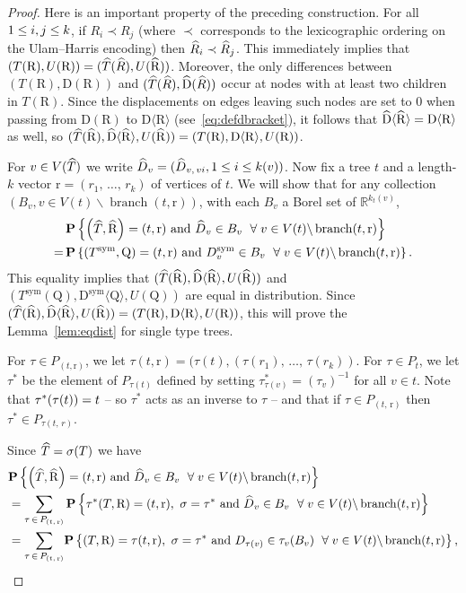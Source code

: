 \documentclass[AHL,Unicode,longabstracts,published]{cedram}
\providecommand{\R}{}
\renewcommand{\R}{\mathbb{R}}
\newcommand{\rD}{\mathrm{D}}
\newcommand{\rQ}{\mathrm{Q}}
\newcommand{\rR}{\mathrm{R}}
\newcommand{\rr}{\mathrm{r}}
\DeclareMathOperator{\sym}{sym}
\DeclareMathOperator{\branch}{branch }
\newcommand{\p}[1]{\mathbf{P}\left\{#1\right\}}
\newcommand{\Permvecs}{P}
\newcommand{\angles}[1]{\langle #1 \rangle}
\let\oldhat\hat
\renewcommand*{\hat}[1]{\mathchoice{\widehat{#1}}{\widehat{#1}}{\oldhat{#1}}{\oldhat{#1}}}
\let\oldforall\forall
\renewcommand*{\forall}{\mathrel{\oldforall}}
\newcommand{\R}{\mathbb{R}}
\begin{document}
\begin{proof}
Here is an important property of the preceding construction. For all $1\le i,j\linebreak \le k$, if $R_i \prec R_j$ (where $\prec$ corresponds to the lexicographic ordering on the Ulam--Harris encoding) then $\hat R_i \prec \hat R_j$. This immediately implies that $(T(\rR),U(\rR))= (\hat T (\hat R),U(\hat \rR))$. Moreover, the only differences between $(T(\rR),\rD(\rR))$ and $(\hat T(\hat R),\hat{\rD}(\hat R))$ occur at nodes with at least two children in $T(\rR)$. Since the displacements on edges leaving such nodes are set to 0 when passing from $\rD(\rR)$ to $\rD\angles{\rR}$ (see~\eqref{eq:defdbracket}), it follows that $\hat \rD\angles{\hat \rR} = \rD\angles{\rR}$ as well, so $(\hat T(\hat \rR),\hat\rD\angles{\hat\rR},U(\hat \rR)) = (T(\rR),\rD\angles{\rR},U(\rR))$.

For $v \in V(\hat{T})$ we write $\hat{D}_v = (\hat{D}_{v,\,vi},1 \le i \le k(v))$. Now fix a tree $t$ and a length-$k$ vector $\rr=(r_1,\,\ldots,\,r_k)$ of vertices of $t$. We will show that for any collection $(B_v, v\in V(t)\backslash \branch(t,\rr))$, with each $B_v$ a Borel set of $\R^{k_t(v)}$,
\begin{align*}
&\p{\left(\hat T,\hat \rR\right)=(t,\rr) \text{ and } \hat D_v \in B_v\ \forall v \in V(t)\backslash \branch(t,\rr)}\\ 
=\,&\p{\left(T^{\sym},\rQ\right)=(t,\rr) \text{ and }D^{\sym}_v \in B_v\ \forall v \in V(t)\backslash \branch(t,\rr)}.
\end{align*}
This equality implies that $(\hat T(\hat \rR),\hat\rD\angles{\hat\rR},U(\hat \rR))$ and $(T^{\sym}(\rQ),\rD^{\sym}\angles{\rQ},U(\rQ))$ are equal in distribution. Since $(\hat T(\hat \rR),\hat\rD\angles{\hat\rR},U(\hat \rR)) = (T(\rR),\rD\angles{\rR},U(\rR))$, this will prove the Lemma~\ref{lem:eqdist} for single type trees.

For $\tau \in \Permvecs_{(t,\rr)}$, we let $\tau(t,\rr)=(\tau(t),(\tau(r_1),\,\ldots,\,\tau(r_k))$. For $\tau \in \Permvecs_t$, we let $\tau^{*}$ be the element of $\Permvecs_{\tau(t)}$ defined by setting $\tau^*_{\tau(v)} = (\tau_v)^{-1}$ for all $v \in t$. Note that $\tau^*(\tau(t))\linebreak=t$ -- so $\tau^*$ acts as an inverse to $\tau$ -- and that if $\tau \in \Permvecs_{(t,\,\rr)}$ then $\tau^*\in \Permvecs_{\tau(t,\,r)}$.

Since $\hat T=\sigma(T)$ we have
\begin{align*}
& \p{\left(\hat T,\hat \rR\right)=(t,\rr)\text{ and } \hat D_v \in B_v\ \forall v \in V(t)\backslash \branch(t,\rr)}\\
&=\sum_{\tau\,\in\,\Permvecs_{(t,\,\rr)}}
\p{\tau^*(T,\rR)=(t,\rr),\ \sigma=\tau^*\text{ and } \hat D_v \in B_v\ \forall v \in V(t)\backslash \branch(t,\rr)}\\
&=\sum_{\tau\,\in\,\Permvecs_{(t,\,\rr)}}
\!\p{(T,\rR)=\tau(t,\rr),\ \sigma=\tau^* \text{ and } D_{\tau(v)} \in \tau_v(B_v)\ \forall v \in V(t)\backslash \branch(t,\rr)},
\end{align*}


\end{proof}
\end{document}
